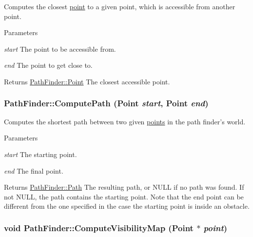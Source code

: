 Computes the closest \hyperlink{structPathFinder_1_1Point}{point} to a given point, which is accessible from another point. 


\begin{DoxyParams}{Parameters}
\item[{\em start}]The point to be accessible from. \item[{\em end}]The point to get close to. \end{DoxyParams}
\begin{DoxyReturn}{Returns}
\hyperlink{structPathFinder_1_1Point}{PathFinder::Point} The closest accessible point. 
\end{DoxyReturn}
\hypertarget{classPathFinder_a7d1904c4ee6abc79375356dc64cad995}{
\subsubsection[{ComputePath}]{ PathFinder::ComputePath ({\bf Point} {\em start}, \/  {\bf Point} {\em end})}}
\label{classPathFinder_a7d1904c4ee6abc79375356dc64cad995}


Computes the shortest path between two given \hyperlink{structPathFinder_1_1Point}{points} in the path finder's world. 


\begin{DoxyParams}{Parameters}
\item[{\em start}]The starting point. \item[{\em end}]The final point. \end{DoxyParams}
\begin{DoxyReturn}{Returns}
\hyperlink{classPathFinder_a269aba09b7b3208092f67f2bc02cf63e}{PathFinder::Path} The resulting path, or NULL if no path was found. If not NULL, the path contains the starting point. Note that the end point can be different from the one specified in the case the starting point is inside an obstacle. 
\end{DoxyReturn}
\hypertarget{classPathFinder_ae567b0e270b68f6b38e9b2fafccdc9ef}{
\subsubsection[{ComputeVisibilityMap}]{\setlength{\rightskip}{0pt plus 5cm}void PathFinder::ComputeVisibilityMap ({\bf Point} $\ast$ {\em point})}}
\label{classPathFinder_ae567b0e270b68f6b38e9b2fafccdc9ef}


